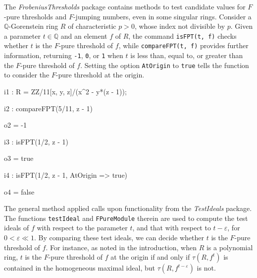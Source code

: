 \documentclass{amsart}
\begin{document}
The \emph{FrobeniusThresholds} package contains methods to test candidate values for $F$-pure thresholds and $F$-jumping numbers, even in some singular rings.
Consider a  $\mathbb{Q}$-Gorenstein ring $R$ of characteristic $p>0$, whose index not divisible by $p$.
Given a parameter $t\in \mathbb{Q}$ and an element $f$ of $R$, the command \texttt{isFPT(t, f)} checks whether $t$ is the $F$-pure threshold of $f$, while \texttt{compareFPT(t, f)} provides further information, returning {\tt-1}, \texttt{0}, or \texttt{1} when $t$ is less than, equal to, or greater than the $F$-pure threshold of $f$.  Setting the option \texttt{AtOrigin} to \texttt{true} tells the function to consider the $F$-pure threshold at the origin.  %

\medskip
{\small
{}
\begin{MyVerbatim}
i1 : R = ZZ/11[x, y, z]/(x^2 - y*(z - 1));

i2 : compareFPT(5/11, z - 1)

o2 = -1

i3 : isFPT(1/2, z - 1)

o3 = true

i4 : isFPT(1/2, z - 1, AtOrigin => true)

o4 = false
\end{MyVerbatim}
}
\medskip


The general method applied calls upon functionality from the \emph{TestIdeals} package.
The functions \texttt{testIdeal} and \texttt{FPureModule} therein are used to compute the test ideals of $f$ with respect to the parameter $t$, and that with respect to $t - \varepsilon$, for $0<\varepsilon\ll 1$.
By comparing these test ideals, we can decide whether $t$ is the $F$-pure threshold of $f$.
For instance, as noted in the introduction, when $R$ is a polynomial ring, $t$ is the $F$-pure threshold of $f$ at the origin if and only if $\tau(R, f^t)$ is contained in the homogeneous maximal ideal, but $\tau(R, f^{t-\varepsilon})$ is not.
\end{document}
